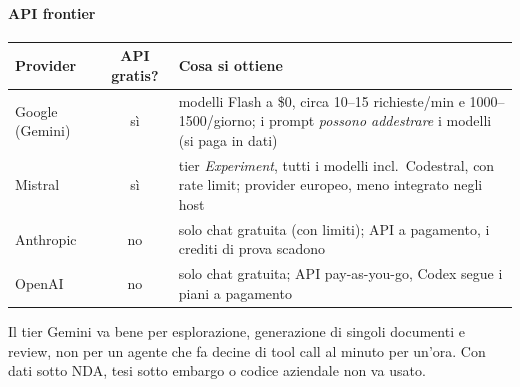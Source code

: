 \documentclass[a4paper,12pt]{article}
\begin{document}
\paragraph{API frontier}
\begin{center}
\begin{tabular}{|l|c|p{9cm}|}
\hline
\textbf{Provider} & \textbf{API gratis?} & \textbf{Cosa si ottiene}\\
\hline
Google (Gemini) & sì & modelli Flash a \$0, circa 10--15 richieste/min e 1000--1500/giorno; i prompt \emph{possono addestrare} i modelli (si paga in dati)\\
Mistral & sì & tier \emph{Experiment}, tutti i modelli incl.\ Codestral, con rate limit; provider europeo, meno integrato negli host\\
Anthropic & no & solo chat gratuita (con limiti); API a pagamento, i crediti di prova scadono\\
OpenAI & no & solo chat gratuita; API pay-as-you-go, Codex segue i piani a pagamento\\
\hline
\end{tabular}
\end{center}
Il tier Gemini va bene per esplorazione, generazione di singoli documenti e review, non per
un agente che fa decine di tool call al minuto per un'ora. Con dati sotto NDA, tesi sotto
embargo o codice aziendale non va usato.
\end{document}
